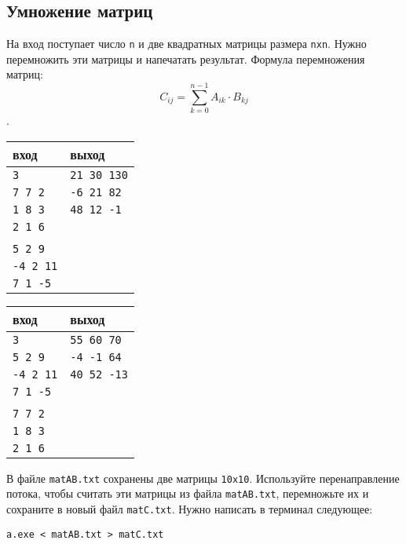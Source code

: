 \documentclass[10pt]{article}
\begin{document}
\subsection{Умножение матриц}
На вход поступает число \texttt{n} и две квадратных матрицы размера \texttt{nxn}. Нужно перемножить эти матрицы и напечатать результат. Формула перемножения матриц:
$$
C_{ij} = \sum\limits_{k=0}^{n-1} A_{ik} \cdot B_{kj}
$$.
\begin{multicols}{2}
\begin{center}
\begin{tabular}{ l | l }
 вход & выход \\ \hline
 \texttt{3} &     \texttt{21 30 130}  \\ 
 \texttt{7 7 2} & \texttt{-6 21 82}  \\
 \texttt{1 8 3} & \texttt{48 12 -1}  \\ 
 \texttt{2 1 6} &  \\ 
 \texttt{} &  \\
 \texttt{5 2 9} &  \\
 \texttt{-4 2 11} &  \\ 
 \texttt{7 1 -5} &  \\ 
\end{tabular}
\end{center}

\begin{center}
\begin{tabular}{ l | l }
 вход & выход \\ \hline
 \texttt{3} &     \texttt{55 60 70}  \\ 
 \texttt{5 2 9} & \texttt{-4 -1 64}  \\
 \texttt{-4 2 11} & \texttt{40 52 -13}  \\ 
 \texttt{7 1 -5} &  \\ 
 \texttt{} &  \\
 \texttt{7 7 2} &  \\
 \texttt{1 8 3} &  \\ 
 \texttt{2 1 6} &  \\ 
\end{tabular}
\end{center}
\end{multicols}

В файле \texttt{matAB.txt} сохранены две матрицы \texttt{10x10}. Используйте перенаправление потока, чтобы считать эти матрицы из файла \texttt{matAB.txt}, перемножьте их и сохраните в новый файл \texttt{matC.txt}. Нужно написать в терминал следующее:
\begin{verbatim}
a.exe < matAB.txt > matC.txt
\end{verbatim}
\end{document}
